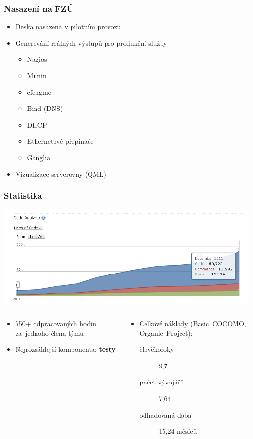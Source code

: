 \documentclass{beamer}
\begin{document}
\begin{frame}[fragile]
\frametitle{Nasazení na FZÚ}
\begin{itemize}
    \item Deska nasazena v pilotním provozu
        \item Generování reálných výstupů pro produkční služby
        \begin{itemize}
            \item Nagios
            \item Munin
            \item cfengine
            \item Bind (DNS)
            \item DHCP
            \item Ethernetové přepínače
            \item Ganglia
        \end{itemize}
    \item Vizualizace serverovny (QML)
\end{itemize}
\end{frame}

\begin{frame}[fragile]
\frametitle{Statistika}

\includegraphics[width=\textwidth]{deska-ohloh-loc-2011.png}

\begin{columns}[t]
\begin{column}{.45\textwidth}
\begin{itemize}
    \item 750+ odpracovaných hodin za~jednoho člena týmu
    \item Nejrozsáhlejší komponenta: {\bf testy}
\end{itemize}
\end{column}
\begin{column}{.6\textwidth}
\begin{itemize}
    \item Celkové náklady (Basic~COCOMO, Organic~Project):
        \begin{description}
            \item[člověkoroky] 9,7
            \item[počet vývojářů] 7,64
            \item[odhadovaná doba] 15,24 měsíců
        \end{description}
\end{itemize}
\end{column}
\end{columns}
\end{frame}
\end{document}
